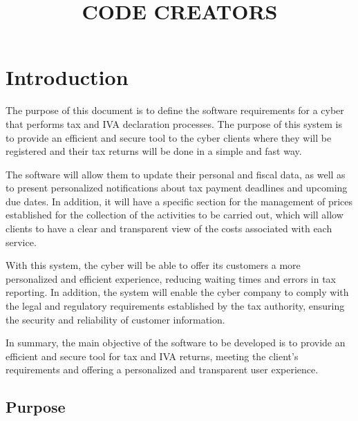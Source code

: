 \documentclass[12pt,a4paper, twosite]{article}
\date{}
\title{CODE CREATORS}
\begin{document}
\maketitle
\tableofcontents

\newpage

\section{Introduction}
\label{sec:org60390fa}

The purpose of this document is to define the software requirements for a cyber that performs tax and IVA declaration processes. The purpose of this system is to provide an efficient and secure tool to the cyber clients where they will be registered and their tax returns will be done in a simple and fast way.

The software will allow them to update their personal and fiscal data, as well as to present personalized notifications about tax payment deadlines and upcoming due dates. In addition, it will have a specific section for the management of prices established for the collection of the activities to be carried out, which will allow clients to have a clear and transparent view of the costs associated with each service.

With this system, the cyber will be able to offer its customers a more personalized and efficient experience, reducing waiting times and errors in tax reporting. In addition, the system will enable the cyber company to comply with the legal and regulatory requirements established by the tax authority, ensuring the security and reliability of customer information.

In summary, the main objective of the software to be developed is to provide an efficient and secure tool for tax and IVA returns, meeting the client's requirements and offering a personalized and transparent user experience.



\subsection{Purpose}
\label{sec:org434c3ef}
\end{document}
